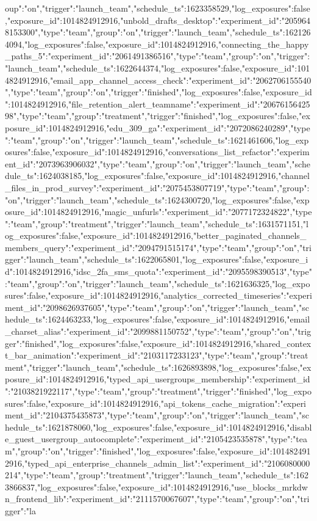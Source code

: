{oup":"on","trigger":"launch_team","schedule_ts":1623358529,"log_exposures":false,"exposure_id":1014824912916},"unbold_drafts_desktop":{"experiment_id":"2059648153300","type":"team","group":"on","trigger":"launch_team","schedule_ts":1621264094,"log_exposures":false,"exposure_id":1014824912916},"connecting_the_happy_paths_5":{"experiment_id":"2061491386516","type":"team","group":"on","trigger":"launch_team","schedule_ts":1622644374,"log_exposures":false,"exposure_id":1014824912916},"email_app_channel_access_check":{"experiment_id":"2062706155540","type":"team","group":"on","trigger":"finished","log_exposures":false,"exposure_id":1014824912916},"file_retention_alert_teamname":{"experiment_id":"2067615642598","type":"team","group":"treatment","trigger":"finished","log_exposures":false,"exposure_id":1014824912916},"edu_309_ga":{"experiment_id":"2072086240289","type":"team","group":"on","trigger":"launch_team","schedule_ts":1621461606,"log_exposures":false,"exposure_id":1014824912916},"conversations_list_refactor":{"experiment_id":"2073963906032","type":"team","group":"on","trigger":"launch_team","schedule_ts":1624038185,"log_exposures":false,"exposure_id":1014824912916},"channel_files_in_prod_survey":{"experiment_id":"2075453807719","type":"team","group":"on","trigger":"launch_team","schedule_ts":1624300720,"log_exposures":false,"exposure_id":1014824912916},"magic_unfurls":{"experiment_id":"2077172324822","type":"team","group":"treatment","trigger":"launch_team","schedule_ts":1631571151,"log_exposures":false,"exposure_id":1014824912916},"better_paginated_channels_members_query":{"experiment_id":"2094791515174","type":"team","group":"on","trigger":"launch_team","schedule_ts":1622065801,"log_exposures":false,"exposure_id":1014824912916},"idsc_2fa_sms_quota":{"experiment_id":"2095598390513","type":"team","group":"on","trigger":"launch_team","schedule_ts":1621636325,"log_exposures":false,"exposure_id":1014824912916},"analytics_corrected_timeseries":{"experiment_id":"2098626937605","type":"team","group":"on","trigger":"launch_team","schedule_ts":1624463233,"log_exposures":false,"exposure_id":1014824912916},"email_charset_alias":{"experiment_id":"2099881150752","type":"team","group":"on","trigger":"finished","log_exposures":false,"exposure_id":1014824912916},"shared_context_bar_animation":{"experiment_id":"2103117233123","type":"team","group":"treatment","trigger":"launch_team","schedule_ts":1626893898,"log_exposures":false,"exposure_id":1014824912916},"typed_api_usergroups_membership":{"experiment_id":"2103821922117","type":"team","group":"treatment","trigger":"finished","log_exposures":false,"exposure_id":1014824912916},"api_tokens_cache_migration":{"experiment_id":"2104375435873","type":"team","group":"on","trigger":"launch_team","schedule_ts":1621878060,"log_exposures":false,"exposure_id":1014824912916},"disable_guest_usergroup_autocomplete":{"experiment_id":"2105423535878","type":"team","group":"on","trigger":"finished","log_exposures":false,"exposure_id":1014824912916},"typed_api_enterprise_channels_admin_list":{"experiment_id":"2106080000214","type":"team","group":"treatment","trigger":"launch_team","schedule_ts":1623866837,"log_exposures":false,"exposure_id":1014824912916},"use_blocks_mrkdwn_frontend_lib":{"experiment_id":"2111570067607","type":"team","group":"on","trigger":"la}

